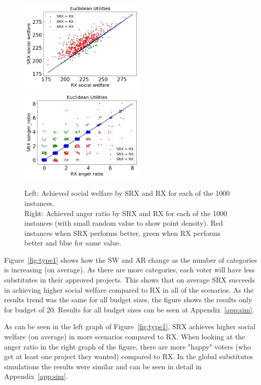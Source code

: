 \documentclass[runningheads]{llncs}
\begin{document}
\begin{figure}[t]
\begin{center}
\includegraphics[width=6cm]{simulation/unit_cat(25)_bud(20).jpeg}
\includegraphics[width=6cm]{simulation/ar_unit_cat(25)_bud(20).jpeg}
\caption{Left: Achieved social welfare by SRX and RX for each of the 1000 instances.\\
Right: Achieved anger ratio by SRX and RX for each of the 1000 instances (with small random value to show point density). Red instances when SRX performs better, green when RX performs better and blue for same value. 
 }\label{fig:scatter}
\end{center}
\end{figure}




Figure~\ref{fig:type1} shows how the SW and AR change as the number of categories is increasing (on average). As there are more categories, each voter will have less substitutes in their approved projects. This shows that on average SRX succeeds in achieving higher social welfare compared to RX in all of the scenarios. As the results trend was the same for all budget sizes, the figure shows the results only for budget of 20. Results for all budget sizes can be seen at Appendix~\ref{app:sim}.

As can be seen in the left graph of Figure~\ref{fig:type1}, SRX  achieves higher social welfare (on average) in more scenarios compared to RX. When looking at the anger ratio in the right graph of the figure, there are more "happy" voters (who get at least one project they wanted) compared to RX. In the global substitutes simulations the results were similar and can be seen in detail in Appendix~\ref{app:sim}.
\end{document}
